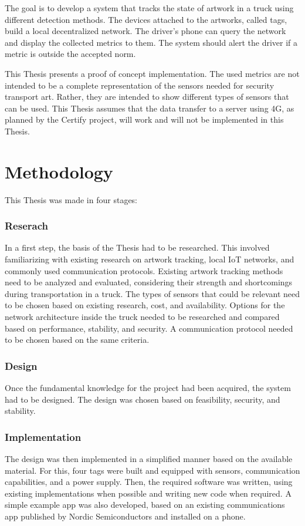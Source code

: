 The goal is to develop a system that tracks the state of artwork in a truck using different detection methods.
The devices attached to the artworks, called tags, build a local decentralized network.
The driver's phone can query the network and display the collected metrics to them.
The system should alert the driver if a metric is outside the accepted norm.

This Thesis presents a proof of concept implementation.
The used metrics are not intended to be a complete representation of the sensors needed for security transport art.
Rather, they are intended to show different types of sensors that can be used.
This Thesis assumes that the data transfer to a server using 4G, as planned by the Certify project, will work and will not be implemented in this Thesis.



\section{Methodology}

This Thesis was made in four stages:

\subsubsection{Reserach}
In a first step, the basis of the Thesis had to be researched.
This involved familiarizing with existing research on artwork tracking, local IoT networks, and commonly used communication protocols.
Existing artwork tracking methods need to be analyzed and evaluated, considering their strength and shortcomings during transportation in a truck.
The types of sensors that could be relevant need to be chosen based on existing research, cost, and availability.
Options for the network architecture inside the truck needed to be researched and compared based on performance, stability, and security.
A communication protocol needed to be chosen based on the same criteria.

\subsubsection{Design}
Once the fundamental knowledge for the project had been acquired, the system had to be designed.
The design was chosen based on feasibility, security, and stability.

\subsubsection{Implementation}
The design was then implemented in a simplified manner based on the available material.
For this, four tags were built and equipped with sensors, communication capabilities, and a power supply.
Then, the required software was written, using existing implementations when possible and writing new code when required.
A simple example app was also developed, based on an existing communications app published by Nordic Semiconductors and installed on a phone.

